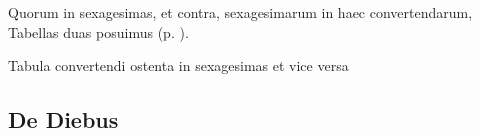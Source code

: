 Quorum in sexagesimas, et
contra, sexagesimarum in haec convertendarum, Tabellas duas posuimus
 (p. \pageref{tab:convertendi_ostenta}).
\begin{table}
\centering
\setlength{\tabcolsep}{3pt}
\renewcommand{\arraystretch}{1.1}

\caption{Tabula convertendi ostenta in sexagesimas et vice versa}
\label{tab:convertendi_ostenta}
\end{table}

\subsection{De Diebus}

